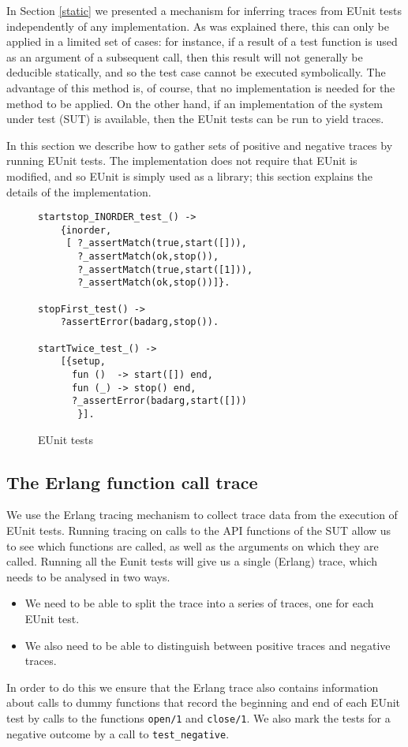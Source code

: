 \documentclass[]{sigplanconf}
\begin{document}
In Section \ref{static} we presented a mechanism for inferring traces from EUnit tests independently of any implementation. As was explained there, this can only be applied in a limited set of cases: for instance, if a result of a test function is used as an argument of a subsequent call, then this result will not generally be deducible statically, and so the test case cannot be executed symbolically. The advantage of this method is, of course, that no implementation is needed  for the method to be applied.  
On the other hand, if an implementation of the system under test (SUT) is available, then the EUnit tests can be run to yield traces. 

In this section we describe how to gather sets of positive and negative traces by running EUnit tests. The implementation does not require that EUnit is modified, and so EUnit is simply used as a library; this section explains the details of the implementation.

\begin{figure}
\begin{verbatim}
startstop_INORDER_test_() ->
    {inorder,
     [ ?_assertMatch(true,start([])),
       ?_assertMatch(ok,stop()),
       ?_assertMatch(true,start([1])),
       ?_assertMatch(ok,stop())]}.

stopFirst_test() ->
    ?assertError(badarg,stop()).

startTwice_test_() ->
    [{setup,
      fun ()  -> start([]) end,       
      fun (_) -> stop() end,         
      ?_assertError(badarg,start([]))  
       }].
\end{verbatim}
\caption{EUnit tests}
\label{tests}
\end{figure}


\subsection{The Erlang function call trace}
\label{function-traces} 

We use the Erlang tracing mechanism to collect trace data from the execution of EUnit tests. Running tracing on calls to the API functions of the SUT allow us to see which functions are called, as well as the arguments on which they are called. Running all the Eunit tests will give us a single (Erlang) trace, which needs to be analysed in two ways.
\begin{itemize}
\item
We need to be able to split the trace into a series of traces, one for each EUnit test.
\item
We also need to be able to distinguish between positive traces and negative traces. 
\end{itemize}
In order to do this we ensure that the Erlang trace also contains information about calls to dummy functions that record the beginning and end of each EUnit test by calls to the functions \texttt{open/1} and \texttt{close/1}. We also mark the tests for a negative outcome by a call to \texttt{test\_negative}.
\end{document}
